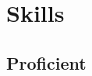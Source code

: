 \documentclass[]{two-column}
\begin{document}
\begin{minipage}[t]{0.33\textwidth}



\section{Skills}
\vspace{1pt}
\subsection{Proficient}
 \textbullet{} %
\vspace{1pt}

\end{minipage}
\end{document}
